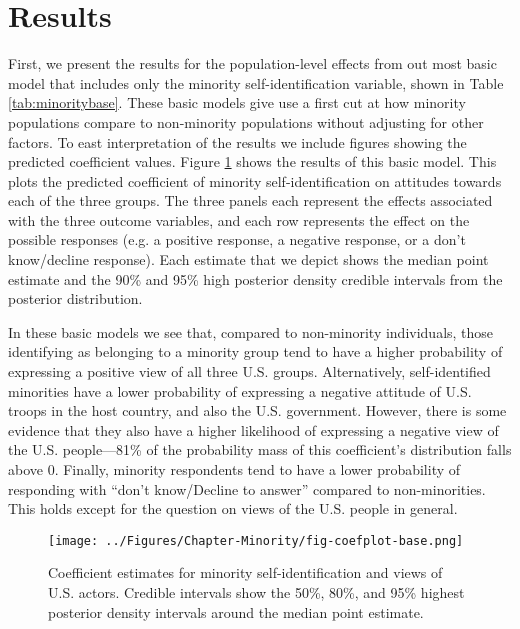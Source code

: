 \section*{Results}

First, we present the results for the population-level effects from out most basic model that includes only the minority self-identification variable, shown in Table \ref{tab:minoritybase}. These basic models give use a first cut at how minority populations compare to non-minority populations without adjusting for other factors. To east interpretation of the results we include figures showing the predicted coefficient values. Figure \ref{fig:minoritycoefbase} shows the results of this basic model. This plots the predicted coefficient of minority self-identification on attitudes towards each of the three groups. The three panels each represent the effects associated with the three outcome variables, and each row represents the effect on the possible responses (e.g. a positive response, a negative response, or a don't know/decline response). Each estimate that we depict shows the median point estimate and the 90\% and 95\% high posterior density credible intervals from the posterior distribution. 


\hspace*{-2cm}{}

In these basic models we see that, compared to non-minority individuals, those identifying as belonging to a minority group tend to have a higher probability of expressing a positive view of all three U.S. groups. Alternatively, self-identified minorities have a lower probability of expressing a negative attitude of U.S. troops in the host country, and also the U.S. government. However, there is some evidence that they also have a higher likelihood of expressing a negative view of the U.S. people---81\% of the probability mass of this coefficient's distribution falls above 0. Finally, minority respondents tend to have a lower probability of responding with ``don't know/Decline to answer'' compared to non-minorities. This holds except for the question on views of the U.S. people in general.

\begin{figure}[t]
	\texttt{[image: ../Figures/Chapter-Minority/fig-coefplot-base.png]}
	\caption{Coefficient estimates for minority self-identification and views of U.S. actors. Credible intervals show the 50\%, 80\%, and 95\% highest posterior density intervals around the median point estimate. }
	\label{fig:minoritycoefbase}
\end{figure}


